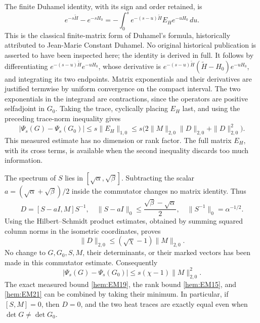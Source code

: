 The finite Duhamel identity, with its sign and order retained, is
\begin{equation}
 e^{-s\widetilde H}-e^{-sH_0}
 =-\int_0^s e^{-(s-u)\widetilde H} E_H e^{-uH_0}\,du.
 \tag{EM18}\label{hem:EM18}
\end{equation}
This is the classical finite-matrix form of Duhamel's formula, historically
attributed to Jean-Marie Constant Duhamel. No original historical publication
is asserted to have been inspected here; the identity is derived in full.
It follows by differentiating
\(e^{-(s-u)\widetilde H}e^{-uH_0}\), whose derivative is
\(e^{-(s-u)\widetilde H}(\widetilde H-H_0)e^{-uH_0}\), and integrating
its two endpoints. Matrix exponentials and their derivatives are
justified termwise by uniform convergence on the compact interval.
The two exponentials in the integrand are contractions, since the
operators are positive selfadjoint in \(G_0\). Taking the trace,
cyclically placing \(E_H\) last, and using the preceding trace-norm
inequality gives
\begin{equation}
 |\Psi_s(G)-\Psi_s(G_0)|\le s\|E_H\|_{1,0}
 \le s\bigl(2\|M\|_{2,0}\|D\|_{2,0}+\|D\|_{2,0}^2\bigr).
 \tag{EM19}\label{hem:EM19}
\end{equation}
This measured estimate has no dimension or rank factor. The full
matrix \(E_H\), with its cross terms, is available when the second
inequality discards too much information.

The spectrum of \(S\) lies in \([\sqrt\alpha,\sqrt\beta]\).
Subtracting the scalar \(a=(\sqrt\alpha+\sqrt\beta)/2\) inside the
commutator changes no matrix identity. Thus
\[
 D=[S-aI,M]S^{-1},\quad
 \|S-aI\|_0\le\frac{\sqrt\beta-\sqrt\alpha}{2},\quad
 \|S^{-1}\|_0=\alpha^{-1/2}.
\]
Using the Hilbert--Schmidt product estimates, obtained by summing
squared column norms in the isometric coordinates, proves
\begin{equation}
 \|D\|_{2,0}\le(\sqrt\chi-1)\|M\|_{2,0}.
 \tag{EM20}\label{hem:EM20}
\end{equation}
No change to \(G,G_0,S,M\), their determinants, or their marked
vectors has been made in this commutator estimate.
Consequently
\begin{equation}
 |\Psi_s(G)-\Psi_s(G_0)|
 \le s(\chi-1)\|M\|_{2,0}^2.
 \tag{EM21}\label{hem:EM21}
\end{equation}
The exact measured bound \eqref{hem:EM19}, the rank bound \eqref{hem:EM15},
and \eqref{hem:EM21} can be combined by taking their minimum.
In particular, if \([S,M]=0\), then \(D=0\), and the two heat traces
are exactly equal even when \(\det G\ne\det G_0\).

